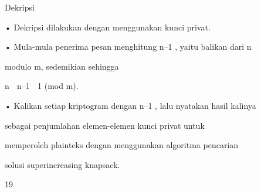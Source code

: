 \documentclass{article}
\begin{document}

Dekripsi

• Dekripsi dilakukan dengan menggunakan kunci privat. 

• Mula-mula penerima pesan menghitung n–1 , yaitu balikan dari n 

modulo m, sedemikian sehingga

   n  n–1  1 (mod m).  

• Kalikan setiap kriptogram dengan n–1 , lalu nyatakan hasil kalinya 

sebagai penjumlahan elemen-elemen kunci privat  untuk 

memperoleh plainteks  dengan menggunakan algoritma pencarian 

solusi superincreasing knapsack.

19
\end{document}
